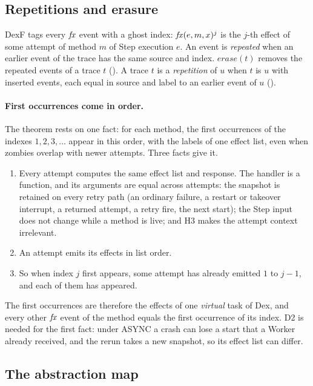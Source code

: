 \subsection{Repetitions and erasure}
\label{sec:repetitions}

DexF tags every $\mathit{fx}$ event with a ghost index: $\mathit{fx}(e, m, x)^j$ is
the $j$-th effect of some attempt of method $m$ of Step execution $e$. An
event is \emph{repeated} when an earlier event of the trace has the same
source and index. $\mathit{erase}(t)$ removes the repeated events of a
trace $t$ (). A trace $t$ is a \emph{repetition} of $u$
when $t$ is $u$ with inserted events, each equal in source and label to an
earlier event of $u$ ().

\paragraph{First occurrences come in order.}
The theorem rests on one fact: for each method, the first occurrences of
the indexes $1, 2, 3, \ldots$ appear in this order, with the labels of one
effect list, even when zombies overlap with newer attempts. Three facts
give it.
\begin{enumerate}
\item Every attempt computes the same effect list and response. The
  handler is a function, and its arguments are equal across attempts: the
  snapshot is retained on every retry path (an ordinary failure, a restart
  or takeover interrupt, a returned attempt, a retry fire, the next start);
  the Step input does not change while a method is live; and H3 makes the
  attempt context irrelevant.
\item An attempt emits its effects in list order.
\item So when index $j$ first appears, some attempt has already emitted
  $1$ to $j-1$, and each of them has appeared.
\end{enumerate}
The first occurrences are therefore the effects of one \emph{virtual} task
of Dex, and every other $\mathit{fx}$ event of the method equals the first
occurrence of its index. D2 is needed for the first fact: under ASYNC a
crash can lose a start that a Worker already received, and the rerun takes
a new snapshot, so its effect list can differ.

\subsection{The abstraction map}
\label{sec:abstraction}


